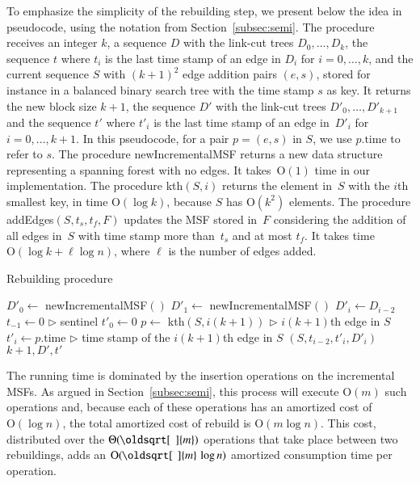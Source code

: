 \documentclass[3p,times,procedia]{elsarticle}
\renewcommand{\sqrt}[2][\mkern8mu]{\mkern-1mu\mathop{\oldsqrt[#1]{#2}}}
\newcommand{\Oh}{\mathrm{O}}
\begin{document}
To emphasize the simplicity of the rebuilding step, we present below 
the idea in pseudocode, using the notation from Section~\ref{subsec:semi}.
The procedure receives an integer $k$, a sequence $D$ with the link-cut trees $D_0,\ldots,D_k$, 
the sequence $t$ where $t_i$ is the last time stamp of an edge in $D_i$ for $i=0,\ldots,k$, and
the current sequence $S$ with $(k+1)^2$ edge addition pairs $(e,s)$, stored 
for instance in a balanced binary search tree with the time stamp $s$ as key.
It returns the new block size $k+1$, the sequence $D'$ with 
the link-cut trees $D'_0,\ldots,D'_{k+1}$ and the sequence $t'$ 
where $t'_i$ is the last time stamp of an edge in~$D'_i$ for $i=0,\ldots,k+1$. 
In this pseudocode, for a pair $p=(e,s)$ in $S$, we use 
$p.\textrm{time}$ to refer to $s$. %
The procedure {\sc newIncrementalMSF} returns 
a new data structure representing a spanning forest with no edges. 
It takes~$\Oh(1)$ time in our implementation. 
The procedure {\sc kth}$(S,i)$ returns the element in~$S$ with the $i$th smallest key, 
in time $\Oh(\log k)$, because $S$ has $\Oh(k^2)$ elements. 
The procedure {\sc addEdges}$(S,t_s,t_f,F)$ updates the MSF stored in~$F$ 
considering the addition of all edges in~$S$ with time stamp more than~$t_s$ 
and at most $t_f$.
It takes time $\Oh(\log k + \ell\log n)$, where $\ell$ is the number of edges added.

\medskip

\begin{algorithm}[h!]
    \caption{Rebuilding procedure}\label{rmsf-build-decomp}
    \begin{algorithmic}[1]
        \State $D'_0 \gets$ {\sc newIncrementalMSF}$()$
        \State $D'_1 \gets$ {\sc newIncrementalMSF}$()$
        \State $D'_i \gets D_{i-2}$
        \EndFor
        \State $t_{-1} \gets 0$ \hfill {\footnotesize $\rhd$ sentinel}
        \State $t'_0 \gets 0$ 
        \State $p \gets$ {\sc kth}$(S,i(k+1))$ \hfill {\footnotesize $\rhd$ $i(k+1)$th edge in $S$}
        \State $t'_i \gets p.\textrm{time}$ \hfill {\footnotesize $\rhd$ time stamp of the $i(k+1)$th edge in $S$}
        $(S,t_{i-2},t'_i,D'_i)$
        \EndFor
        \State \Return $k+1,D',t'$
        \EndFunction
    \end{algorithmic}
\end{algorithm}

The running time is dominated by the insertion operations 
on the incremental MSFs.  As argued in Section~\ref{subsec:semi}, 
this process will execute $\Oh(m)$ such operations and, 
because each of these operations has an amortized cost of $\Oh(\log{n})$,
the total amortized cost of {\sc rebuild} is $\Oh(m \log{n})$.  This cost, distributed 
over the $\Theta(\sqrt{m})$ operations that take place between two rebuildings,
adds an $\Oh(\sqrt{m}\,\log{n})$ amortized consumption time per operation.
\end{document}
